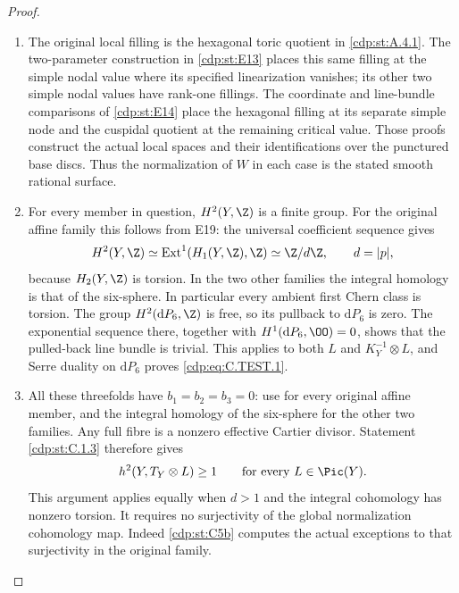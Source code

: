 \begin{proof}

\begin{enumerate}[label={$\langle1\rangle$\arabic*.},leftmargin=*]
\item The original local filling is the hexagonal toric quotient
in \ref{cdp:st:A.4.1}. The two-parameter construction in \ref{cdp:st:E13} places this
same filling at the simple nodal value where its specified
linearization vanishes; its other two simple nodal values
have rank-one fillings. The coordinate and line-bundle
comparisons of \ref{cdp:st:E14} place the hexagonal filling at its
separate simple node and the cuspidal quotient at the
remaining critical value. Those proofs construct the actual
local spaces and their identifications over the punctured
base discs. Thus the normalization of $W$ in each case is
the stated smooth rational surface.

\item For every member in question, $H^2(Y,\Z)$ is a finite
group. For the original affine family this follows from E19:
the universal coefficient sequence gives
\[
 H^2(Y,\Z)\simeq\operatorname{Ext}^1(H_1(Y,\Z),\Z)
 \simeq\Z/d\Z,\qquad d=|p|,
\]
because $H_2(Y,\Z)$ is torsion. In the two other families
the integral homology is that of the six-sphere. In
particular every ambient first Chern class is torsion.
The group $H^2(\mathrm dP_6,\Z)$ is free, so its pullback
to $\mathrm dP_6$ is zero. The exponential sequence there,
together with $H^1(\mathrm dP_6,\OO)=0$, shows that the
pulled-back line bundle is trivial. This applies to both
$L$ and $K_Y^{-1}\otimes L$, and Serre duality on
$\mathrm dP_6$ proves \eqref{cdp:eq:C.TEST.1}.

\item All these threefolds have $b_1=b_2=b_3=0$: use  for
every original affine member, and the integral homology
of the six-sphere for the other two families. Any full
fibre is a nonzero effective Cartier divisor. Statement
\ref{cdp:st:C.1.3} therefore gives
\[
 h^2(Y,T_Y\otimes L)\geq 1
 \qquad\text{for every }L\in\Pic(Y).
\]
This argument applies equally when $d>1$ and the integral
cohomology has nonzero torsion. It requires no surjectivity
of the global normalization cohomology map. Indeed \ref{cdp:st:C5b}
computes the actual exceptions to that surjectivity in
the original family.


\end{enumerate}
\end{proof}
